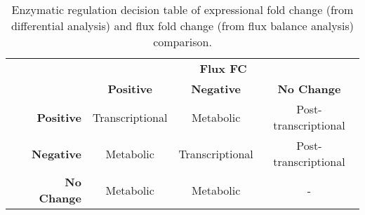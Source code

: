 \begin{table}[H]
\begin{center}
\caption[Enzymatic regulation decision table of expressional fold change (from differential analysis) and flux fold change (from flux balance analysis) comparison.]{Enzymatic regulation decision table \cite{bordel2010sampling} of expressional fold change (from differential analysis) and flux fold change (from flux balance analysis) comparison.}
\baselineskip
\label{table:regulation_table}

\begin{tabular}{lrccc}
                                                                         & \multicolumn{1}{l}{}                    & \multicolumn{3}{c}{\textbf{Flux FC}}                                                                          \\ \cline{3-5}
                                                                         & \multicolumn{1}{c}{\textbf{}}           & \textbf{Positive}                    & \textbf{Negative}                    & \textbf{No Change}                        \\ \cline{3-5}
\multicolumn{1}{l|}{\parbox[t]{3mm}{}} & \multicolumn{1}{r|}{\textbf{Positive}}  & \multicolumn{1}{c|}{Transcriptional} & \multicolumn{1}{c|}{Metabolic}       & \multicolumn{1}{c|}{Post-transcriptional} \\ \cline{3-5}
\multicolumn{1}{l|}{}                                                    & \multicolumn{1}{r|}{\textbf{Negative}}  & \multicolumn{1}{c|}{Metabolic}       & \multicolumn{1}{c|}{Transcriptional} & \multicolumn{1}{c|}{Post-transcriptional} \\ \cline{3-5}
\multicolumn{1}{l|}{}                                                    & \multicolumn{1}{r|}{\textbf{No Change}} & \multicolumn{1}{c|}{Metabolic}       & \multicolumn{1}{c|}{Metabolic}       & \multicolumn{1}{c|}{-}                    \\ \cline{3-5}
\end{tabular}
\end{center}
\end{table}

\vspace{-1.0cm}

